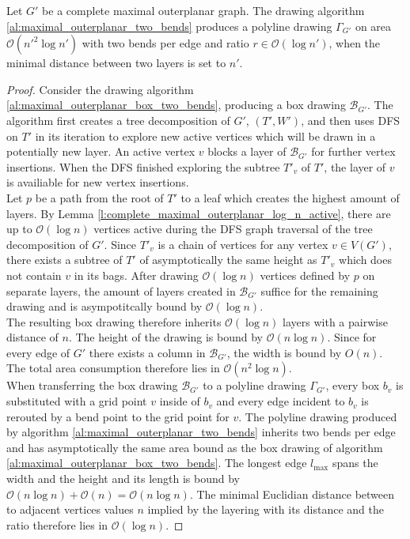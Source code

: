 \begin{theorem}
	Let $G'$ be a complete maximal outerplanar graph. The drawing algorithm \ref{al:maximal_outerplanar_two_bends} produces a polyline drawing $\Gamma_{G'}$ on area $\mathcal{O}(n'^2 \log n')$ with two bends per edge and ratio $r \in \mathcal{O}(\log n')$, when the minimal distance between two layers is set to $n'$.\label{th:complete_maximal_outerplanar_ratio_logn}
\end{theorem}
\begin{proof}
	Consider the drawing algorithm \ref{al:maximal_outerplanar_box_two_bends}, producing a box drawing $\mathcal{B}_{G'}$. The algorithm first creates a tree decomposition of $G'$, $(T',W')$, and then uses DFS on $T'$ in its iteration to explore new active vertices which will be drawn in a potentially new layer. An active vertex $v$ blocks a layer of $\mathcal{B}_{G'}$ for further vertex insertions. When the DFS finished exploring the subtree $T'_{v}$ of $T'$, the layer of $v$ is availiable for new vertex insertions.\\
	Let $p$ be a path from the root of $T'$ to a leaf which creates the highest amount of layers. By Lemma \ref{l:complete_maximal_outerplanar_log_n_active}, there are up to $\mathcal{O}(\log n)$ vertices active during the DFS graph traversal of the tree decomposition of $G'$. Since $T'_{v}$ is a chain of vertices for any vertex $v\in V(G')$, there exists a subtree of $T'$ of asymptotically the same height as $T'_{v}$ which does not contain $v$ in its bags. After drawing $\mathcal{O}(\log n)$ vertices defined by $p$ on separate layers, the amount of layers created in $\mathcal{B}_{G'}$ suffice for the remaining drawing and is asympotitcally bound by $\mathcal{O}(\log n)$.\\
	The resulting box drawing therefore inherits $\mathcal{O}(\log n)$ layers with a pairwise distance of $n$. The height of the drawing is bound by $\mathcal{O}(n \log n)$. Since for every edge of $G'$ there exists a column in $\mathcal{B}_{G'}$, the width is bound by $O(n)$. The total area consumption therefore lies in $\mathcal{O}(n^2 \log n)$.\\
	When transferring the box drawing $\mathcal{B}_{G'}$ to a polyline drawing $\Gamma_{G'}$, every box $b_v$ is substituted with a grid point $v$ inside of $b_v$ and every edge incident to $b_v$ is rerouted by a bend point to the grid point for $v$. The polyline drawing produced by algorithm \ref{al:maximal_outerplanar_two_bends} inherits two bends per edge and has asymptotically the same area bound as the box drawing of algorithm \ref{al:maximal_outerplanar_box_two_bends}. The longest edge $l_{\max}$ spans the width and the height and its length is bound by $\mathcal{O}(n \log n) + \mathcal{O}(n) = \mathcal{O}(n \log n)$. The minimal Euclidian distance between to adjacent vertices values $n$ implied by the layering with its distance and the ratio therefore lies in $\mathcal{O}(\log n)$.
\end{proof}

